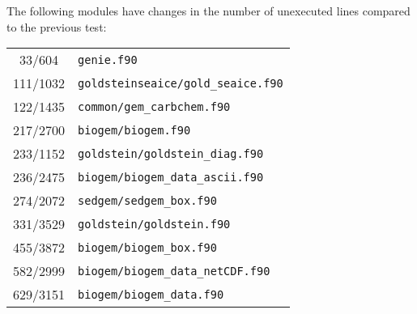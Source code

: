 \documentclass[a4paper,10pt,article]{memoir}
\begin{document}
The following modules have changes in the number of unexecuted lines
compared to the previous test:
\begin{center}
\begin{tabular}{cl}
 33/604  & \texttt{genie.f90}                        \\
111/1032 & \texttt{goldsteinseaice/gold\_seaice.f90} \\
122/1435 & \texttt{common/gem\_carbchem.f90}         \\
217/2700 & \texttt{biogem/biogem.f90}                \\
233/1152 & \texttt{goldstein/goldstein\_diag.f90}    \\
236/2475 & \texttt{biogem/biogem\_data\_ascii.f90}   \\
274/2072 & \texttt{sedgem/sedgem\_box.f90}           \\
331/3529 & \texttt{goldstein/goldstein.f90}          \\
455/3872 & \texttt{biogem/biogem\_box.f90}           \\
582/2999 & \texttt{biogem/biogem\_data\_netCDF.f90}  \\
629/3151 & \texttt{biogem/biogem\_data.f90}          \\
\end{tabular}
\end{center}
\end{document}
